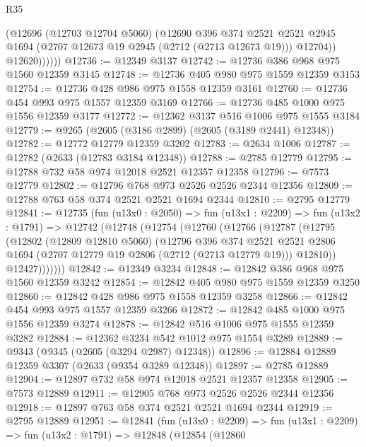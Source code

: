 \begin{lexlean}{R35}
\begin{coremodule}
                (@12696
                  (@12703 @12704 @5060)
                  (@12690
                    @396
                    @374
                    @2521
                    @2521
                    @2945
                    @1694
                    (@2707 @12673 @19 @2945 (@2712 (@2713 @12673 @19)))
                    @12704))
                @12620))))))
@12736 := @12349 @3137
@12742 := @12736 @386 @968 @975 @1560 @12359 @3145
@12748 := @12736 @405 @980 @975 @1559 @12359 @3153
@12754 := @12736 @428 @986 @975 @1558 @12359 @3161
@12760 := @12736 @454 @993 @975 @1557 @12359 @3169
@12766 := @12736 @485 @1000 @975 @1556 @12359 @3177
@12772 := @12362 @3137 @516 @1006 @975 @1555 @3184
@12779 := @9265 (@2605 (@3186 @2899) (@2605 (@3189 @2441) @12348))
@12782 := @12772 @12779 @12359 @3202
@12783 := @2634 @1006
@12787 := @12782 (@2633 (@12783 @3184 @12348))
@12788 := @2785 @12779
@12795 := @12788 @732 @58 @974 @12018 @2521 @12357 @12358
@12796 := @7573 @12779
@12802 := @12796 @768 @973 @2526 @2526 @2344 @12356
@12809 := @12788 @763 @58 @374 @2521 @2521 @1694 @2344
@12810 := @2795 @12779
@12841 := @12735
    (fun (u13x0 : @2050) =>
    fun (u13x1 : @2209) =>
    fun (u13x2 : @1791) =>
    @12742
      (@12748
        (@12754
          (@12760
            (@12766
              (@12787
                (@12795
                  (@12802
                    (@12809 @12810 @5060)
                    (@12796
                      @396
                      @374
                      @2521
                      @2521
                      @2806
                      @1694
                      (@2707 @12779 @19 @2806 (@2712 (@2713 @12779 @19)))
                      @12810))
                  @12427)))))))
@12842 := @12349 @3234
@12848 := @12842 @386 @968 @975 @1560 @12359 @3242
@12854 := @12842 @405 @980 @975 @1559 @12359 @3250
@12860 := @12842 @428 @986 @975 @1558 @12359 @3258
@12866 := @12842 @454 @993 @975 @1557 @12359 @3266
@12872 := @12842 @485 @1000 @975 @1556 @12359 @3274
@12878 := @12842 @516 @1006 @975 @1555 @12359 @3282
@12884 := @12362 @3234 @542 @1012 @975 @1554 @3289
@12889 := @9343 (@9345 (@2605 (@3294 @2987) @12348))
@12896 := @12884 @12889 @12359 @3307 (@2633 (@9354 @3289 @12348))
@12897 := @2785 @12889
@12904 := @12897 @732 @58 @974 @12018 @2521 @12357 @12358
@12905 := @7573 @12889
@12911 := @12905 @768 @973 @2526 @2526 @2344 @12356
@12918 := @12897 @763 @58 @374 @2521 @2521 @1694 @2344
@12919 := @2795 @12889
@12951 := @12841
    (fun (u13x0 : @2209) =>
    fun (u13x1 : @2209) =>
    fun (u13x2 : @1791) =>
    @12848
      (@12854
        (@12860

\end{coremodule}
\end{lexlean}
